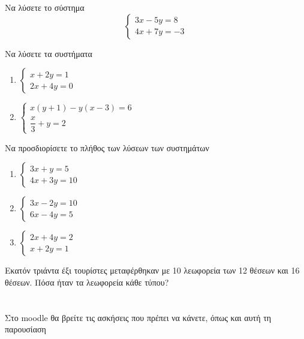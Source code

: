 \documentclass{../presentation}
\begin{document}
\begin{askisi}
  Να λύσετε το σύστημα
  $$\begin{cases}
      3x-5y=8 \\
      4x+7y=-3
    \end{cases}$$
\end{askisi}

\begin{askisi}
  Να λύσετε τα συστήματα
  \begin{multicols}{2}
    \begin{enumerate}[<+->]
      \item
            $\begin{cases}
                x+2y=1 \\
                2x+4y=0
              \end{cases}$
      \item
            $\begin{cases}
                x(y+1)-y(x-3)=6 \\
                \dfrac{x}{3}+y=2
              \end{cases}$
    \end{enumerate}
  \end{multicols}
\end{askisi}

\begin{askisi}
  Να προσδιορίσετε το πλήθος των λύσεων των συστημάτων
  \begin{multicols}{3}
    \begin{enumerate}[<+->]
      \item
            $\begin{cases}
                3x+y=5 \\
                4x+3y=10
              \end{cases}$
      \item
            $\begin{cases}
                3x-2y=10 \\
                6x-4y=5
              \end{cases}$
      \item
            $\begin{cases}
                2x+4y=2 \\
                x+2y=1
              \end{cases}$
    \end{enumerate}
  \end{multicols}
\end{askisi}

\begin{askisi}
  Εκατόν τριάντα έξι τουρίστες μεταφέρθηκαν με 10 λεωφορεία των 12 θέσεων και 16 θέσεων. Πόσα ήταν τα λεωφορεία κάθε τύπου?
\end{askisi}

\section{}
\begin{frame}
  Στο moodle θα βρείτε τις ασκήσεις που πρέπει να κάνετε, όπως και αυτή τη παρουσίαση
\end{frame}
\end{document}
